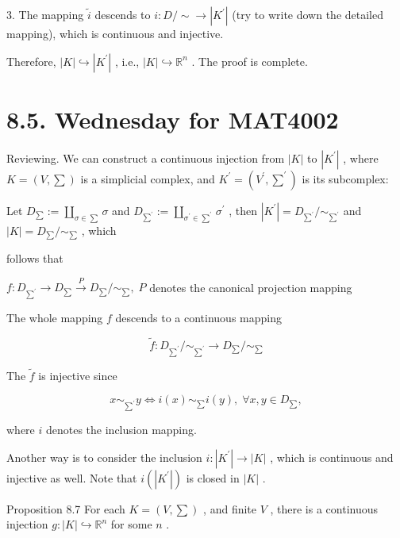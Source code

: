 3. The mapping \(\widetilde{i}\) descends to \(i : D/ \sim   \rightarrow  \left| {K}^{\prime }\right|\) (try to write down the detailed mapping), which is continuous and injective.

Therefore, \(\left| K\right|  \hookrightarrow  \left| {K}^{\prime }\right|\) , i.e., \(\left| K\right|  \hookrightarrow  {\mathbb{R}}^{n}\) . The proof is complete.

\section*{8.5. Wednesday for MAT4002}

Reviewing. We can construct a continuous injection from \(\left| K\right|\) to \(\left| {K}^{\prime }\right|\) , where \(K = \left( {V,\sum }\right)\) is a simplicial complex, and \({K}^{\prime } = \left( {{V}^{\prime },{\sum }^{\prime }}\right)\) is its subcomplex:

Let \({D}_{\sum } \mathrel{\text{ := }} \mathop{\coprod }\limits_{{\sigma  \in  \sum }}\sigma\) and \({D}_{{\sum }^{\prime }} \mathrel{\text{ := }} \mathop{\coprod }\limits_{{{\sigma }^{\prime } \in  {\sum }^{\prime }}}{\sigma }^{\prime }\) , then \(\left| {K}^{\prime }\right|  = {D}_{{\sum }^{\prime }}/{ \sim  }_{{\sum }^{\prime }}\) and \(\left| K\right|  = {D}_{\sum }/{ \sim  }_{\sum }\) , which

follows that

\(f : {D}_{{\sum }^{\prime }} \rightarrow  {D}_{\sum }\overset{P}{ \rightarrow  }{D}_{\sum }/{ \sim  }_{\sum },\;P\) denotes the canonical projection mapping

The whole mapping \(f\) descends to a continuous mapping

\[
\widetilde{f} : {D}_{{\sum }^{\prime }}/{ \sim  }_{{\sum }^{\prime }} \rightarrow  {D}_{\sum }/{ \sim  }_{\sum }
\]

The \(\widetilde{f}\) is injective since

\[
x{ \sim  }_{{\sum }^{\prime }}y \Leftrightarrow  i\left( x\right) { \sim  }_{\sum }i\left( y\right) ,\;\forall x,y \in  {D}_{\sum }, \tag{8.14}
\]

where \(i\) denotes the inclusion mapping.

Another way is to consider the inclusion \(i : \left| {K}^{\prime }\right|  \rightarrow  \left| K\right|\) , which is continuous and injective as well. Note that \(i\left( \left| {K}^{\prime }\right| \right)\) is closed in \(\left| K\right|\) .

Proposition 8.7 For each \(K = \left( {V,\sum }\right)\) , and finite \(V\) , there is a continuous injection \(g : \left| K\right|  \hookrightarrow  {\mathbb{R}}^{n}\) for some \(n\) .

